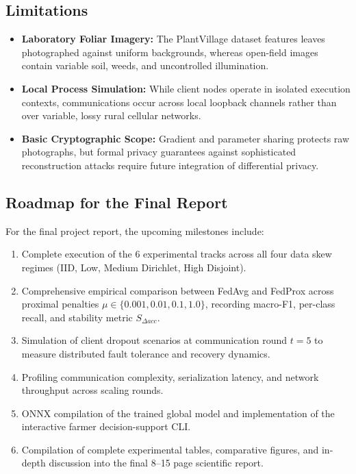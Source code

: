 \documentclass[applsci,article,submit,oneauthor,pdftex]{Definitions/mdpi}
\begin{document}
\subsection{Limitations}
\begin{itemize}[leftmargin=*]
    \item \textbf{Laboratory Foliar Imagery:} The PlantVillage dataset features leaves photographed against uniform backgrounds, whereas open-field images contain variable soil, weeds, and uncontrolled illumination.
    \item \textbf{Local Process Simulation:} While client nodes operate in isolated execution contexts, communications occur across local loopback channels rather than over variable, lossy rural cellular networks.
    \item \textbf{Basic Cryptographic Scope:} Gradient and parameter sharing protects raw photographs, but formal privacy guarantees against sophisticated reconstruction attacks require future integration of differential privacy.
\end{itemize}

\subsection{Roadmap for the Final Report}
For the final project report, the upcoming milestones include:
\begin{enumerate}[leftmargin=*]
    \item Complete execution of the 6 experimental tracks across all four data skew regimes (IID, Low, Medium Dirichlet, High Disjoint).
    \item Comprehensive empirical comparison between FedAvg and FedProx across proximal penalties $\mu \in \{0.001, 0.01, 0.1, 1.0\}$, recording macro-F1, per-class recall, and stability metric $S_{\Delta acc}$.
    \item Simulation of client dropout scenarios at communication round $t=5$ to measure distributed fault tolerance and recovery dynamics.
    \item Profiling communication complexity, serialization latency, and network throughput across scaling rounds.
    \item ONNX compilation of the trained global model and implementation of the interactive farmer decision-support CLI.
    \item Compilation of complete experimental tables, comparative figures, and in-depth discussion into the final 8--15 page scientific report.
\end{enumerate}
\end{document}
